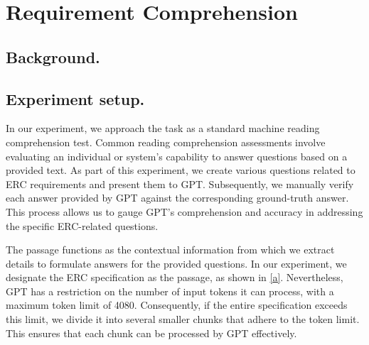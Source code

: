 \section{Requirement Comprehension}

\subsection{Background.}

\subsection{Experiment setup.} 
In our experiment, we approach the task as a standard machine reading comprehension test. 
Common reading comprehension assessments involve evaluating an individual or system's capability to answer questions based on a provided text. 
As part of this experiment, we create various questions related to ERC requirements and present them to GPT. 
Subsequently, we manually verify each answer provided by GPT against the corresponding ground-truth answer. 
This process allows us to gauge GPT's comprehension and accuracy in addressing the specific ERC-related questions. 

The passage functions as the contextual information from which we extract details to formulate answers for the provided questions. 
In our experiment, we designate the ERC specification as the passage, as shown in \ref{a}. 
Nevertheless, GPT has a restriction on the number of input tokens it can process, with a maximum token limit of 4080. 
Consequently, if the entire specification exceeds this limit, 
we divide it into several smaller chunks that adhere to the token limit. This ensures that each chunk can be processed by GPT effectively. 

